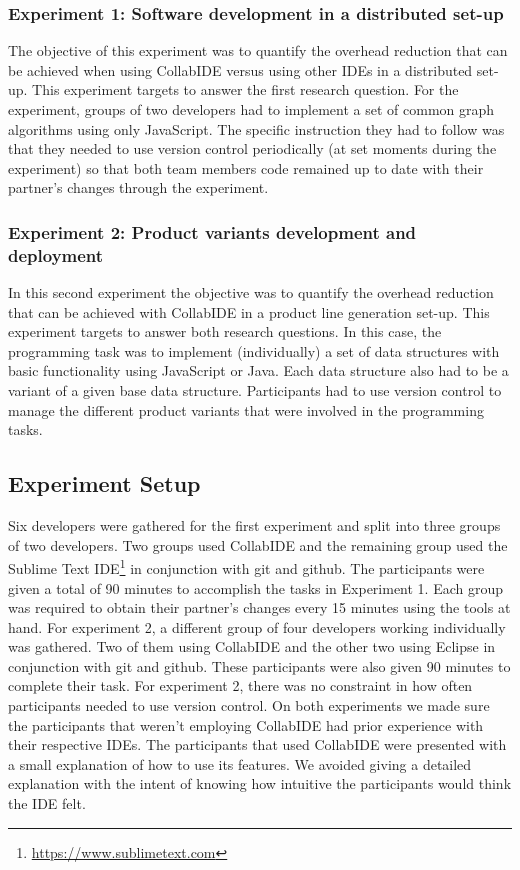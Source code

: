 \subsubsection{Experiment 1: Software development in a distributed set-up}
The objective of this experiment was to quantify the overhead reduction that can be achieved when 
using CollabIDE versus using other IDEs in a distributed set-up. This experiment targets to answer the 
first research question. For the experiment, groups of two developers had to implement a set of 
common graph algorithms using only JavaScript. The specific instruction they had to follow was that 
they needed to use version control periodically (at set moments during the experiment) so that both 
team members code remained up to date with their partner's changes through the experiment. 


\subsubsection{Experiment 2: Product variants development and deployment}
In this second experiment the objective was to quantify the overhead reduction that can be achieved 
with CollabIDE in a product line generation set-up. This experiment targets to answer both research 
questions. In this case, the programming task was to implement (individually) a set of 
data structures with basic functionality using JavaScript or Java. Each data structure also had to be a 
variant of a given base data structure. Participants had to use version control to manage the different 
product variants that were involved in the programming tasks.

\subsection{Experiment Setup}

Six developers were gathered for the first experiment and split into three groups of two developers. 
Two groups used CollabIDE and the remaining group used the Sublime Text 
IDE\footnote{\url{https://www.sublimetext.com}} in conjunction with git and github. The participants 
were given a total of 90 minutes to accomplish the tasks in Experiment 1. Each group was required to 
obtain their partner’s changes every 15 minutes using the tools at hand. For experiment 2, a different 
group of four developers working individually was gathered. Two of them using CollabIDE and the 
other two using Eclipse in conjunction with git and github. These participants were also given 90 
minutes to complete their task. For experiment 2, there was no constraint in how often participants 
needed to use version control. On both experiments we made sure the participants that weren't employing
CollabIDE had prior experience with their respective IDEs. The participants that used CollabIDE were presented
with a small explanation of how to use its features. We avoided giving a detailed explanation with the intent of
knowing how intuitive the participants would think the IDE felt.
	

